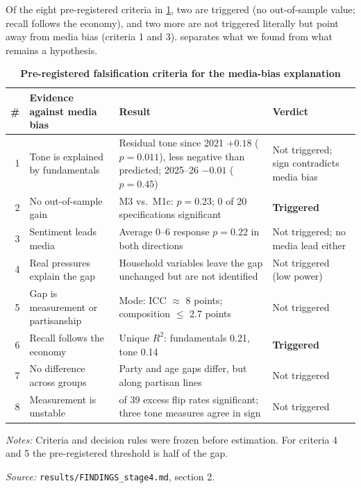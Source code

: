 \documentclass[11pt]{article}
\begin{document}
Of the eight pre-registered criteria in \cref{tab:falsify}, two are triggered (no out-of-sample value; recall follows the economy), and two more are not triggered literally but point away from media bias (criteria 1 and 3).  separates what we found from what remains a hypothesis.

\begin{table}[htbp]
\centering
\begin{threeparttable}
\caption{\textbf{Pre-registered falsification criteria for the media-bias explanation}}
\label{tab:falsify}
\footnotesize
\begin{tabularx}{\textwidth}{@{}r >{\raggedright\arraybackslash}p{} >{\raggedright\arraybackslash}X >{\raggedright\arraybackslash}p{}@{}}
\toprule
\# & Evidence against media bias & Result & Verdict\\
\midrule
1 & Tone is explained by fundamentals & Residual tone since 2021 $+0.18$ ($p = 0.011$), less negative than predicted; 2025–26 $-0.01$ ($p = 0.45$) & Not triggered; sign contradicts media bias\\
2 & No out-of-sample gain & M3 vs.\ M1c: $p = 0.23$; 0 of 20 specifications significant & \textbf{Triggered}\\
3 & Sentiment leads media & Average 0–6 response $p = 0.22$ in both directions & Not triggered; no media lead either\\
4 & Real pressures explain the gap & Household variables leave the gap unchanged but are not identified & Not triggered (low power)\\
5 & Gap is measurement or partisanship & Mode: ICC $\approx$ 8 points; composition $\leq$ 2.7 points & Not triggered\\
6 & Recall follows the economy & Unique $R^2$: fundamentals 0.21, tone 0.14 & \textbf{Triggered}\\
7 & No difference across groups & Party and age gaps differ, but along partisan lines & Not triggered\\
8 & Measurement is unstable & 0 of 39 excess flip rates significant; three tone measures agree in sign & Not triggered\\
\bottomrule
\end{tabularx}
\begin{tablenotes}[flushleft]\footnotesize
\item \textit{Notes:} Criteria and decision rules were frozen before estimation. For criteria 4 and 5 the pre-registered threshold is half of the gap.
\item \textit{Source:} \texttt{results/FINDINGS\_stage4.md}, section 2.
\end{tablenotes}
\end{threeparttable}
\end{table}
\end{document}
